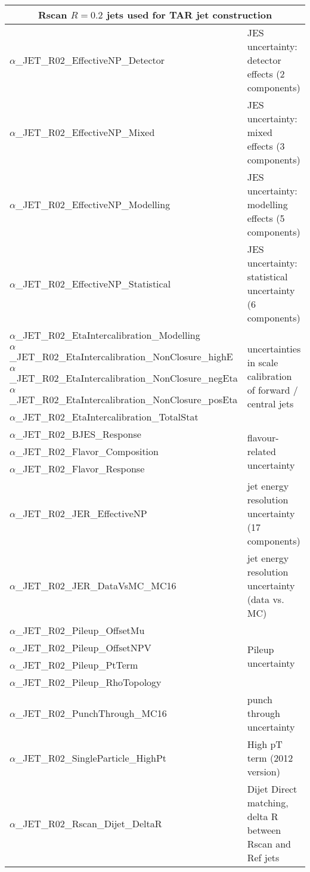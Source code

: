 {\begin{longtable}{p{7cm} p{8cm}}
\multicolumn{2}{c}{\textbf{Rscan \(R=0.2\) jets used for TAR jet construction }}  \\
\midrule
\(\alpha\)\_JET\_R02\_EffectiveNP\_Detector   & JES uncertainty: detector effects (2 components)        \\
\(\alpha\)\_JET\_R02\_EffectiveNP\_Mixed      & JES uncertainty: mixed effects (3 components)            \\
\(\alpha\)\_JET\_R02\_EffectiveNP\_Modelling  & JES uncertainty: modelling effects (5 components)         \\
\(\alpha\)\_JET\_R02\_EffectiveNP\_Statistical  & JES uncertainty: statistical uncertainty (6 components)         \\
\(\alpha\)\_JET\_R02\_EtaIntercalibration\_Modelling            & \multirow{5}{*}{uncertainties in scale calibration of forward / central jets}  \\
\(\alpha\)\_JET\_R02\_EtaIntercalibration\_NonClosure\_highE    &  \\
\(\alpha\)\_JET\_R02\_EtaIntercalibration\_NonClosure\_negEta  &   \\
\(\alpha\)\_JET\_R02\_EtaIntercalibration\_NonClosure\_posEta  &  \\
\(\alpha\)\_JET\_R02\_EtaIntercalibration\_TotalStat &  \\
\(\alpha\)\_JET\_R02\_BJES\_Response      & \multirow{3}{*}{flavour-related uncertainty}  \\
\(\alpha\)\_JET\_R02\_Flavor\_Composition &   \\
\(\alpha\)\_JET\_R02\_Flavor\_Response    &  \\
\(\alpha\)\_JET\_R02\_JER\_EffectiveNP    & jet energy resolution uncertainty (17 components)  \\
\(\alpha\)\_JET\_R02\_JER\_DataVsMC\_MC16 & jet energy resolution uncertainty (data vs. MC)  \\
\(\alpha\)\_JET\_R02\_Pileup\_OffsetMu    &  \multirow{4}{*}{Pileup uncertainty}  \\
\(\alpha\)\_JET\_R02\_Pileup\_OffsetNPV   &  \\
\(\alpha\)\_JET\_R02\_Pileup\_PtTerm &  \\
\(\alpha\)\_JET\_R02\_Pileup\_RhoTopology &   \\
\(\alpha\)\_JET\_R02\_PunchThrough\_MC16 & punch through uncertainty  \\
\(\alpha\)\_JET\_R02\_SingleParticle\_HighPt  & High pT term (2012 version)  \\
\(\alpha\)\_JET\_R02\_Rscan\_Dijet\_DeltaR & Dijet Direct matching, delta R between Rscan and Ref jets  \\

\end{longtable}}
